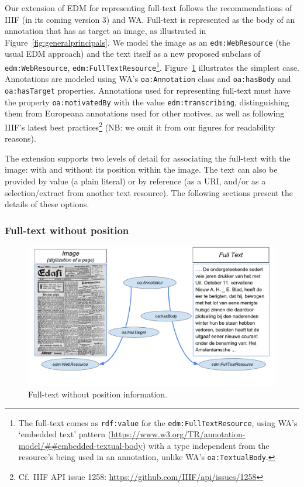 \documentclass[a4paper,UKenglish,cleveref, autoref]{oasics-v2019}
\begin{document}
Our extension of EDM for representing full-text follows the recommendations of IIIF (in its coming version 3) and WA. Full-text is represented as the body of an annotation that has as target an image, as illustrated in Figure~\ref{fig:generalprincipals}. We model the image as an \verb+edm:WebResource+ (the usual EDM approach) and the text itself as a new proposed subclass of \verb+edm:WebResource+, 
\verb+edm:FullTextResource+\footnote{The full-text comes as \verb+rdf:value+ for the \verb+edm:FullTextResource+, using WA’s `embedded text' pattern (\url{https://www.w3.org/TR/annotation-model/##embedded-textual-body}) with a type independent from the resource’s being used in an annotation, unlike WA’s \verb+oa:TextualBody+.}.
Figure~\ref{fig:nopositioninfo} illustrates the simplest case. Annotations are modeled using WA's \verb+oa:Annotation+ class and \verb+oa:hasBody+ and \verb+oa:hasTarget+ properties. Annotations used for representing full-text must have the property \verb+oa:motivatedBy+ with the value \verb+edm:transcribing+, distinguishing them from Europeana annotations used for other motives, as well as following IIIF's latest best practices\footnote{Cf.\, IIIF API issue 1258: \url{https://github.com/IIIF/api/issues/1258}}
(NB: we omit it from our figures for readability reasons).

The extension supports two levels of detail for associating the full-text with the image: with and without its position within the image. The text can also be provided by value (a plain literal) or by reference (as a URI, and/or as a selection/extract from another text resource). The following sections present the details of these options.

\subsubsection{Full-text without position}

\begin{figure}
    \centering
    \includegraphics{Fig2}
    \caption{Full-text without position information.}\label{fig:nopositioninfo}
\end{figure}
\end{document}
